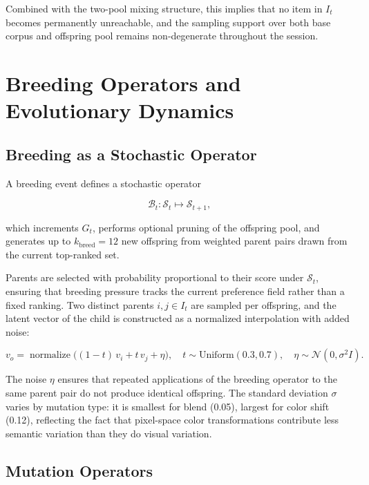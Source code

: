 \documentclass[12pt, a4paper]{article}
\theoremstyle{definition}
\begin{document}
Combined with the two-pool mixing structure, this implies that no item in $I_t$ becomes permanently unreachable, and the sampling support over both base corpus and offspring pool remains non-degenerate throughout the session.

\section{Breeding Operators and Evolutionary Dynamics}

\subsection{Breeding as a Stochastic Operator}

A breeding event defines a stochastic operator

\begin{equation}
\mathcal{B}_t : \mathcal{S}_t \mapsto \mathcal{S}_{t+1},
\end{equation}

which increments $G_t$, performs optional pruning of the offspring pool, and generates up to $k_{\mathrm{breed}} = 12$ new offspring from weighted parent pairs drawn from the current top-ranked set.

Parents are selected with probability proportional to their score under $\mathcal{S}_t$, ensuring that breeding pressure tracks the current preference field rather than a fixed ranking. Two distinct parents $i, j \in I_t$ are sampled per offspring, and the latent vector of the child is constructed as a normalized interpolation with added noise:

\begin{equation}
v_o = \operatorname{normalize}\!\bigl((1-t)\,v_i + t\,v_j + \eta\bigr),\quad t \sim \mathrm{Uniform}(0.3, 0.7),\quad \eta \sim \mathcal{N}(0,\sigma^2 I).
\end{equation}

The noise $\eta$ ensures that repeated applications of the breeding operator to the same parent pair do not produce identical offspring. The standard deviation $\sigma$ varies by mutation type: it is smallest for blend (0.05), largest for color shift (0.12), reflecting the fact that pixel-space color transformations contribute less semantic variation than they do visual variation.

\subsection{Mutation Operators}
\end{document}
